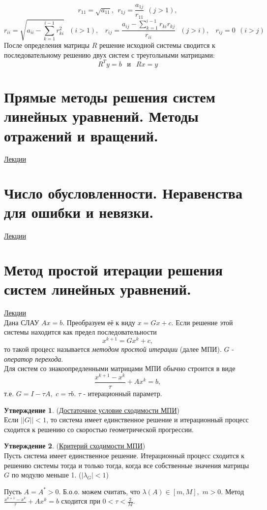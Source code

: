 \documentclass[specialist, subf, href, colorlinks=true, 12pt, times, mtpro, final]{disser}
\theoremstyle{definition}
\newtheorem{state}{Утверждение}[section]
\begin{document}
{    $$
    r_{11} = \sqrt{a_{11}}, \ \ r_{1j} = \frac{a_{1j}}{r_{11}} \ \ (j > 1),
    $$
    $$
    r_{ii} = \sqrt{a_{ii} - \sum \limits_{k=1}^{i-1} r^2_{ki}} \ \ \ (i > 1),  \ \ \ \    r_{ij} = \frac{a_{ij} - \sum \limits_{k = 1}^{i-1} r_{ki} r_{kj}}{r_{ii}} \ \ \ (j > i), \ \ \ \ r_{ij} = 0 \ \ (i > j)
    $$
    После определения матрицы $R$ решение исходной системы сводится к последовательному решению двух систем с треугольными матрицами:
    $$
    R^Ty = b \ \ \text{ и } \ \  Rx = y 
    $$
\section {Прямые методы решения систем линейных уравнений. Методы отражений и вращений.}
    \hyperlink {lects.54}{Лекции}\\

\section {Число обусловленности. Неравенства для ошибки и невязки.}
    \hyperlink {lects.56}{Лекции}\\

\section {Метод простой итерации решения систем линейных уравнений.}
    \hyperlink {lects.58}{Лекции}\\
    Дана СЛАУ $Ax = b$. Преобразуем её к виду $x = Gx + c$. Если решение этой системы находится как предел последовательности
    $$
        x^{k+1} = Gx^{k} + c,
    $$
    то такой процесс называется {\it методом простой итерации} (далее МПИ). $G$ - {\it оператор перехода}.\\
    Для систем со знакоопредленными матрицами МПИ обычно строится в виде
    $$
        \frac{x^{k+1} - x^{k}}{\tau} + Ax^{k} = b,
    $$
    т.е. $G = I - \tau A, \,\, c = \tau b$. $\tau$ - итерационный параметр.
    \begin{state} (\hyperlink {lects.58}{Достаточное условие сходимости МПИ})\\
    Если $||G|| < 1$, то система имеет единственное решение и итерационный процесс сходится
    к решению со скоростью геометрической прогрессии.
    \end{state}
    \begin{state} (\hyperlink {lects.59}{Критерий сходимости МПИ})\\
    Пусть система имеет единственное решение. Итерационный процесс сходится к решению системы тогда и только тогда, когда все собственные значения матрицы $G$ по модулю меньше 1. ($|\lambda_{G}| < 1$)
    \end{state}
    Пусть $A = A^* > 0$. Б.о.о. можем считать, что $\lambda(A) \in [m, M],\,\, m > 0$.
    Метод $ \frac{x^{k+1} - x^{k}}{\tau} + Ax^{k} = b$ сходится при $0 < \tau < \frac{2}{M}$.

}
\end{document}
